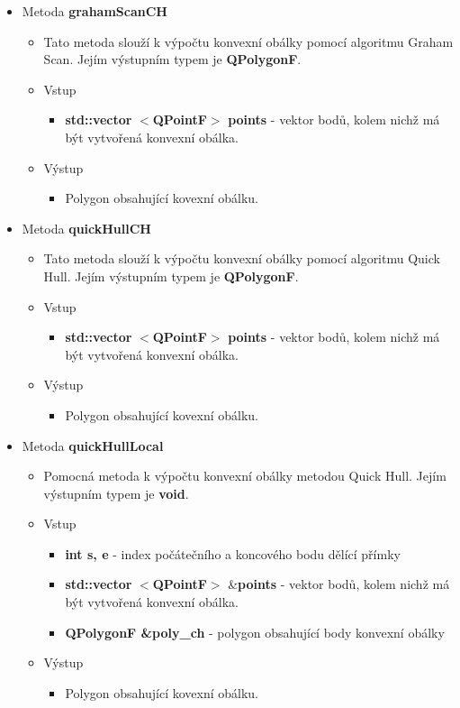\documentclass[a4paper, 12pt]{article}
\begin{document}
\begin{itemize}
	\item Metoda \textbf{grahamScanCH}
		\begin{itemize}
			\item Tato metoda slouží k výpočtu konvexní obálky pomocí algoritmu Graham Scan. Jejím výstupním typem je \textbf{QPolygonF}.
			\item Vstup
				\begin{itemize}
					\item \textbf{std::vector} $<$\textbf{QPointF}$>$ \textbf{points} - vektor bodů, kolem nichž má být vytvořená konvexní obálka.
				\end{itemize}
			\item Výstup
				\begin{itemize}
					\item Polygon obsahující kovexní obálku.
				\end{itemize} 
		\end{itemize}

	\item Metoda \textbf{quickHullCH}
		\begin{itemize}
			\item Tato metoda slouží k výpočtu konvexní obálky pomocí algoritmu Quick Hull. Jejím výstupním typem je \textbf{QPolygonF}.
			\item Vstup
				\begin{itemize}
					\item \textbf{std::vector} $<$\textbf{QPointF}$>$ \textbf{points} - vektor bodů, kolem nichž má být vytvořená konvexní obálka.
				\end{itemize}
			\item Výstup
				\begin{itemize}
					\item Polygon obsahující kovexní obálku.
				\end{itemize} 
		\end{itemize}

	\item Metoda \textbf{quickHullLocal}
		\begin{itemize}
			\item Pomocná metoda k výpočtu konvexní obálky metodou Quick Hull. Jejím výstupním typem je \textbf{void}.
			\item Vstup
				\begin{itemize}
					\item \textbf{int s, e} - index počátečního a koncového bodu dělící přímky
					\item \textbf{std::vector} $<$\textbf{QPointF}$>$ \&\textbf{points} - vektor bodů, kolem nichž má být vytvořená konvexní obálka.
					\item \textbf{QPolygonF \&poly\_ch} - polygon obsahující body konvexní obálky
				\end{itemize}
			\item Výstup
				\begin{itemize}
					\item Polygon obsahující kovexní obálku.
				\end{itemize} 
		\end{itemize}


\end{itemize}
\end{document}
